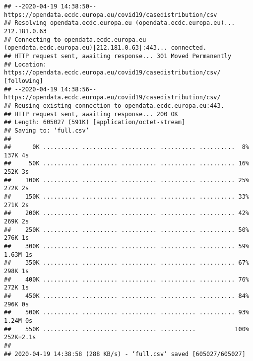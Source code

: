 \documentclass[]{article}
\newenvironment{Shaded}{\begin{snugshade}}{\end{snugshade}}
\newcommand{\CommentTok}[1]{\textcolor[rgb]{0.56,0.35,0.01}{\textit{#1}}}
\newcommand{\KeywordTok}[1]{\textcolor[rgb]{0.13,0.29,0.53}{\textbf{#1}}}
\newcommand{\NormalTok}[1]{#1}
\newcommand{\OperatorTok}[1]{\textcolor[rgb]{0.81,0.36,0.00}{\textbf{#1}}}
\newcommand{\StringTok}[1]{\textcolor[rgb]{0.31,0.60,0.02}{#1}}
\begin{document}
\begin{verbatim}
## --2020-04-19 14:38:50--  https://opendata.ecdc.europa.eu/covid19/casedistribution/csv
## Resolving opendata.ecdc.europa.eu (opendata.ecdc.europa.eu)... 212.181.0.63
## Connecting to opendata.ecdc.europa.eu (opendata.ecdc.europa.eu)|212.181.0.63|:443... connected.
## HTTP request sent, awaiting response... 301 Moved Permanently
## Location: https://opendata.ecdc.europa.eu/covid19/casedistribution/csv/ [following]
## --2020-04-19 14:38:56--  https://opendata.ecdc.europa.eu/covid19/casedistribution/csv/
## Reusing existing connection to opendata.ecdc.europa.eu:443.
## HTTP request sent, awaiting response... 200 OK
## Length: 605027 (591K) [application/octet-stream]
## Saving to: ‘full.csv’
## 
##      0K .......... .......... .......... .......... ..........  8%  137K 4s
##     50K .......... .......... .......... .......... .......... 16%  252K 3s
##    100K .......... .......... .......... .......... .......... 25%  272K 2s
##    150K .......... .......... .......... .......... .......... 33%  271K 2s
##    200K .......... .......... .......... .......... .......... 42%  269K 2s
##    250K .......... .......... .......... .......... .......... 50%  276K 1s
##    300K .......... .......... .......... .......... .......... 59% 1.63M 1s
##    350K .......... .......... .......... .......... .......... 67%  298K 1s
##    400K .......... .......... .......... .......... .......... 76%  272K 1s
##    450K .......... .......... .......... .......... .......... 84%  296K 0s
##    500K .......... .......... .......... .......... .......... 93% 1.24M 0s
##    550K .......... .......... .......... ..........           100%  252K=2.1s
## 
## 2020-04-19 14:38:58 (288 KB/s) - ‘full.csv’ saved [605027/605027]
\end{verbatim}

\begin{Shaded}
\end{Shaded}
\end{document}
